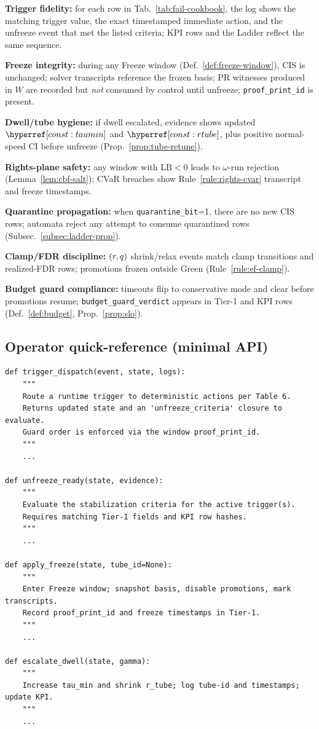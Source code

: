 \begin{acceptchecks}
\item \textbf{Trigger fidelity:} for each row in Tab.~\ref{tab:fail-cookbook}, the log shows the matching trigger value, the exact timestamped immediate action, and the unfreeze event that met the listed criteria; KPI rows and the Ladder reflect the same sequence.
\item \textbf{Freeze integrity:} during any Freeze window (Def.~\ref{def:freeze-window}), CIS is unchanged; solver transcripts reference the frozen basis; PR witnesses produced in $W$ are recorded but \emph{not} consumed by control until unfreeze; \texttt{proof\_print\_id} is present.
\item \textbf{Dwell/tube hygiene:} if dwell escalated, evidence shows updated $\constref{taumin}$ and $\constref{rtube}$, plus positive normal-speed CI before unfreeze (Prop.~\ref{prop:tube-retune}).
\item \textbf{Rights-plane safety:} any window with $\mathrm{LB}<0$ leads to $\omega$-run rejection (Lemma~\ref{lem:cbf-salt}); CVaR breaches show Rule~\ref{rule:rights-cvar} transcript and freeze timestamps.
\item \textbf{Quarantine propagation:} when \texttt{quarantine\_bit}=1, there are no new CIS rows; automata reject any attempt to consume quarantined rows (Subsec.~\ref{subsec:ladder-prop}).
\item \textbf{Clamp/FDR discipline:} $(r,q)$ shrink/relax events match clamp transitions and realized-FDR rows; promotions frozen outside Green (Rule~\ref{rule:ef-clamp}).
\item \textbf{Budget guard compliance:} timeouts flip to conservative mode and clear before promotions resume; \texttt{budget\_guard\_verdict} appears in Tier-1 and KPI rows (Def.~\ref{def:budget}, Prop.~\ref{prop:slo}).
\end{acceptchecks}

\subsection{Operator quick-reference (minimal API)}\label{subsec:runbook-api}
\emph{}
\begin{lstlisting}
def trigger_dispatch(event, state, logs):
    """
    Route a runtime trigger to deterministic actions per Table 6.
    Returns updated state and an 'unfreeze_criteria' closure to evaluate.
    Guard order is enforced via the window proof_print_id.
    """
    ...

def unfreeze_ready(state, evidence):
    """
    Evaluate the stabilization criteria for the active trigger(s).
    Requires matching Tier-1 fields and KPI row hashes.
    """
    ...

def apply_freeze(state, tube_id=None):
    """
    Enter Freeze window; snapshot basis, disable promotions, mark transcripts.
    Record proof_print_id and freeze timestamps in Tier-1.
    """
    ...

def escalate_dwell(state, gamma):
    """
    Increase tau_min and shrink r_tube; log tube-id and timestamps; update KPI.
    """
    ...
\end{lstlisting}
